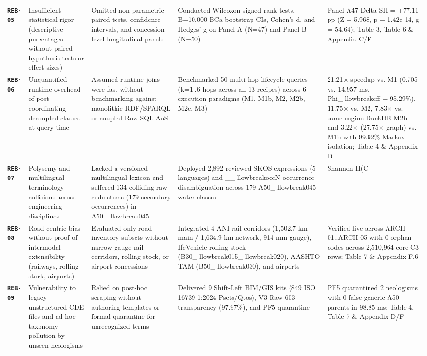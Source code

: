 \documentclass[10pt,a4paper]{article}
\begin{document}
{\begin{longtable}{p{}p{}p{}p{}p{}}
\textbf{\texttt{REB-05}} & Insufficient statistical rigor (descriptive percentages without paired hypothesis tests or effect sizes) & Omitted non-parametric paired tests, confidence intervals, and concession-level longitudinal panels & Conducted Wilcoxon signed-rank tests, B=10,000 BCa bootstrap CIs, Cohen's d, and Hedges' g on Panel A (N=47) and Panel B (N=50) & Panel A47 Delta SII = +77.11 pp (Z = 5.968, p = 1.42e-14, g = 54.64); Table 3, Table 6 \& Appendix C/F \\
\textbf{\texttt{REB-06}} & Unquantified runtime overhead of post-coordinating decoupled classes at query time & Assumed runtime joins were fast without benchmarking against monolithic RDF/SPARQL or coupled Row-SQL AoS & Benchmarked 50 multi-hop lifecycle queries (k=1..6 hops across all 13 recipes) across 6 execution paradigms (M1, M1b, M2, M2b, M2c, M3) & 21.21$\times$ speedup vs. M1 (0.705 vs. 14.957 ms, Phi\_llowbreak{}eff = 95.29\%), 11.75$\times$ vs. M2, 7.83$\times$ vs. same-engine DuckDB M2b, and 3.22$\times$ (27.75$\times$ graph) vs. M1b with 99.92\% Markov isolation; Table 4 \& Appendix D \\
\textbf{\texttt{REB-07}} & Polysemy and multilingual terminology collisions across engineering disciplines & Lacked a versioned multilingual lexicon and suffered 134 colliding raw code stems (179 secondary occurrences) in A50\_llowbreak{}045 & Deployed 2,892 reviewed SKOS expressions (5 languages) and \_\_llowbreak{}occN occurrence disambiguation across 179 A50\_llowbreak{}045 water classes & Shannon H(C \\
\textbf{\texttt{REB-08}} & Road-centric bias without proof of intermodal extensibility (railways, rolling stock, airports) & Evaluated only road inventory subsets without narrow-gauge rail corridors, rolling stock, or airport concessions & Integrated 4 ANI rail corridors (1,502.7 km main / 1,634.9 km network, 914 mm gauge), IfcVehicle rolling stock (B30\_llowbreak{}015\_llowbreak{}020), AASHTO TAM (B50\_llowbreak{}030), and airports & Verified live across ARCH-01..ARCH-05 with 0 orphan codes across 2,510,964 core C3 rows; Table 7 \& Appendix F.6 \\
\textbf{\texttt{REB-09}} & Vulnerability to legacy unstructured CDE files and ad-hoc taxonomy pollution by unseen neologisms & Relied on post-hoc scraping without authoring templates or formal quarantine for unrecognized terms & Delivered 9 Shift-Left BIM/GIS kits (849 ISO 16739-1:2024 Psets/Qtos), V3 Raw-603 transparency (97.97\%), and PF5 quarantine & PF5 quarantined 2 neologisms with 0 false generic A50 parents in 98.85 ms; Table 4, Table 7 \& Appendix D/F \\

\end{longtable}}
\end{document}
